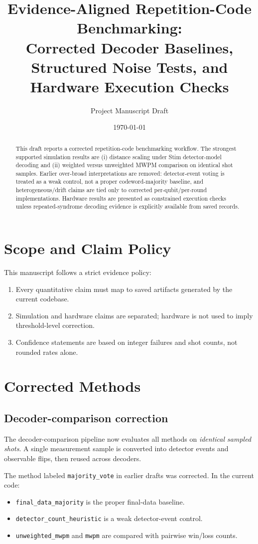 \documentclass[11pt]{article}
\title{Evidence-Aligned Repetition-Code Benchmarking:\\
Corrected Decoder Baselines, Structured Noise Tests, and Hardware Execution Checks}
\author{Project Manuscript Draft}
\date{\today}
\begin{document}
\maketitle

\begin{abstract}
This draft reports a corrected repetition-code benchmarking workflow. The strongest supported simulation results are (i) distance scaling under Stim detector-model decoding and (ii) weighted versus unweighted MWPM comparison on identical shot samples. Earlier over-broad interpretations are removed: detector-event voting is treated as a weak control, not a proper codeword-majority baseline, and heterogeneous/drift claims are tied only to corrected per-qubit/per-round implementations. Hardware results are presented as constrained execution checks unless repeated-syndrome decoding evidence is explicitly available from saved records.
\end{abstract}

\section{Scope and Claim Policy}
This manuscript follows a strict evidence policy:
\begin{enumerate}
    \item Every quantitative claim must map to saved artifacts generated by the current codebase.
    \item Simulation and hardware claims are separated; hardware is not used to imply threshold-level correction.
    \item Confidence statements are based on integer failures and shot counts, not rounded rates alone.
\end{enumerate}

\section{Corrected Methods}
\subsection{Decoder-comparison correction}
The decoder-comparison pipeline now evaluates all methods on \emph{identical sampled shots}. A single measurement sample is converted into detector events and observable flips, then reused across decoders.

The method labeled \texttt{majority\_vote} in earlier drafts was corrected. In the current code:
\begin{itemize}
    \item \texttt{final\_data\_majority} is the proper final-data baseline.
    \item \texttt{detector\_count\_heuristic} is a weak detector-event control.
    \item \texttt{unweighted\_mwpm} and \texttt{mwpm} are compared with pairwise win/loss counts.
\end{itemize}
\end{document}
